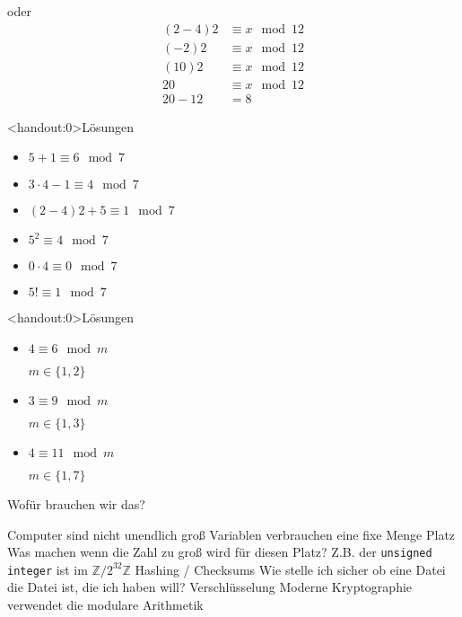 {\begin{frame}
\begin{itemize}[<+- | alert@+>]
		      oder
		      \begin{align*}
			      (2-4)2 & \equiv x \mod 12 \\
			      (-2)2  & \equiv x \mod 12 \\
			      (10)2  & \equiv x \mod 12 \\
			      20     & \equiv x \mod 12 \\
			      20-12  & = 8
		      \end{align*}
	\end{itemize}
\end{frame}

\begin{frame}<handout:0>{Lösungen}
	\begin{itemize}[<+- | alert@+>]
		\item $5 + 1      \equiv 6 \mod 7$
		\item $3\cdot4-1  \equiv 4 \mod 7$
		\item $(2-4)2+5   \equiv 1 \mod 7$
		\item $5^2        \equiv 4 \mod 7$
		\item $0\cdot4    \equiv 0 \mod 7$
		\item $5!         \equiv 1 \mod 7$
	\end{itemize}
\end{frame}

\begin{frame}<handout:0>{Lösungen}
	\begin{itemize}[<+- | alert@+>]
		\item $4 \equiv 6 \mod m$

		      $m \in \{1,2\}$
		\item $3 \equiv 9 \mod m$

		      $m \in \{1,3\}$
		\item $4 \equiv 11 \mod m$

		      $m \in \{1,7\}$
	\end{itemize}
\end{frame}
}

\begin{frame}{Wofür brauchen wir das?}
	\begin{outline}
		\1 Computer sind nicht unendlich groß
		\2 Variablen verbrauchen eine fixe Menge Platz
		\2 Was machen wenn die Zahl zu groß wird für diesen Platz?
		\2 Z.B. der \texttt{unsigned integer} ist im $\mathbb Z / 2^{32}\mathbb Z$
		\pause
		\1 Hashing / Checksums
		\2 Wie stelle ich sicher ob eine Datei die Datei ist, die ich haben will?
		\pause
		\1 Verschlüsselung
		\2 Moderne Kryptographie verwendet die modulare Arithmetik

	\end{outline}
\end{frame}

